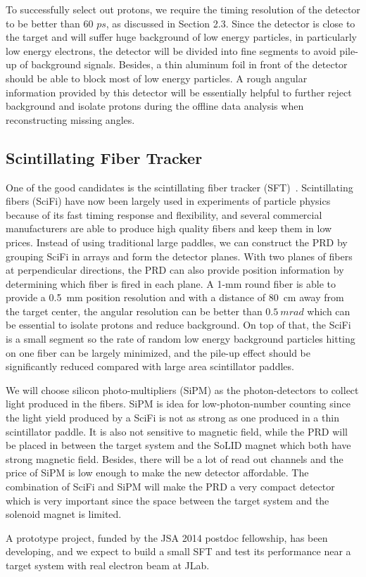 To successfully select out protons, we require the timing resolution of the detector to be better than 60 $ps$, as discussed in Section 2.3. Since the detector is close to the target and will suffer huge background of low energy particles, in particularly low energy electrons, the detector will be divided into fine segments to avoid pile-up of background signals. Besides, a thin aluminum foil in front of the detector should be able to block most of low energy particles. A rough angular information provided by this detector will be essentially helpful to further reject background and isolate protons during the offline data analysis when reconstructing missing angles.

\subsection{Scintillating Fiber Tracker}
One of the good candidates is the scintillating fiber tracker (SFT)~\cite{sft_zye}. Scintillating fibers (SciFi) have now been largely used in experiments of particle physics because of its fast timing response and flexibility, and several commercial manufacturers are able to produce high quality fibers and keep them in low prices. Instead of using traditional large paddles, we can construct the PRD by grouping SciFi in arrays and form the detector planes.  With two planes of fibers at perpendicular directions, the PRD can also provide position information by determining which fiber is fired in each plane. A 1-mm round fiber is able to provide a 0.5~mm position resolution and with a distance of 80~cm away from the target center, the angular resolution can be better than $0.5~mrad$ which can be essential to isolate protons and reduce background. On top of that, the SciFi is a small segment so the rate of random low energy background particles hitting on one fiber can be largely minimized, and the pile-up effect should be significantly reduced compared with large area scintillator paddles.

We will choose silicon photo-multipliers (SiPM) as the photon-detectors to collect light produced in the fibers. SiPM is idea for low-photon-number counting since the light yield produced by a SciFi is not as strong as one produced in a thin scintillator paddle. It is also not sensitive to magnetic field, while the PRD will be placed in between the target system and the SoLID magnet which both have strong magnetic field. Besides, there will be a lot of read out channels and the price of SiPM is low enough to make the new detector affordable.  The combination of SciFi and SiPM will make the PRD a very compact detector which is very important since the space between the target system and the solenoid magnet is limited. 

A prototype project, funded by the JSA 2014 postdoc fellowship, has been developing, and we expect to build a small SFT and test its performance near a target system with real electron beam at JLab. 

